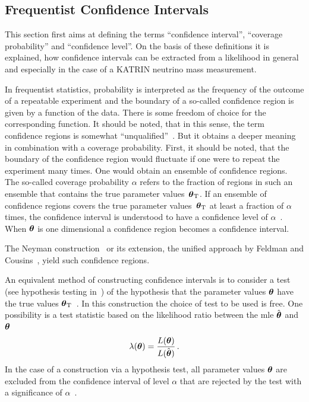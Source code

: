 \subsection{Frequentist Confidence Intervals}
\label{sec:statMethodsUncertaintyIntervalsConfidence}
This section first aims at defining the terms ``confidence interval'', ``coverage probability'' and ``confidence level''. On the basis of these definitions it is explained, how confidence intervals can be extracted from a likelihood in general and especially in the case of a KATRIN neutrino mass measurement.

In frequentist statistics, probability is interpreted as the frequency of the outcome of a repeatable experiment and the boundary of a so-called confidence region is given by a function of the data. There is some freedom of choice for the corresponding function. It should be noted, that in this sense, the term confidence regions is somewhat ``unqualified''~\cite{ReviewOfParticlePhysics}. But it obtains a deeper meaning in combination with a coverage probability. First, it should be noted, that the boundary of the confidence region would fluctuate if one were to repeat the experiment many times. One would obtain an ensemble of confidence regions. The so-called coverage probability $\alpha$ refers to the fraction of regions in such an ensemble that contains the true parameter values~$\boldsymbol{\mathbf{\theta}}_\mathrm{T}$\cite{ReviewOfParticlePhysics}. If an ensemble of confidence regions covers the true parameter values~$\boldsymbol{\mathbf{\theta}}_\mathrm{T}$ at least a fraction of $\alpha$ times, the confidence interval is understood to have a confidence level of $\alpha$~\cite{ReviewOfParticlePhysics}. When $\boldsymbol{\mathbf{\theta}}$ is one dimensional a confidence region becomes a confidence interval. 

The Neyman construction~\cite{Neyman1937} or its extension, the unified approach by Feldman and Cousins~\cite{Feldman1998}, yield such confidence regions.

An equivalent method of constructing confidence intervals is to consider a test (see hypothesis testing in~\cite{ReviewOfParticlePhysics}) of the hypothesis that the parameter values $\boldsymbol{\mathbf{\theta}}$ have the true values $\boldsymbol{\mathbf{\theta}}_\mathrm{T}$~\cite{ReviewOfParticlePhysics}. In this construction the choice of test to be used is free. One possibility is a test statistic based on the likelihood ratio between the \gls{mle} $\hat{\boldsymbol{\mathbf{\theta}}}$ and $\boldsymbol{\mathbf{\theta}}$~\cite{ReviewOfParticlePhysics}
\begin{equation}
	\label{eq:statMethodsLikelihoodRatio}
	\lambda(\boldsymbol{\mathbf{\theta}}) =
	\frac{L(\boldsymbol{\mathbf{\theta}})}{L(\hat{\boldsymbol{\mathbf{\theta}}})}
	\text{\,.}
\end{equation}
In the case of a construction via a hypothesis test, all parameter values $\boldsymbol{\mathbf{\theta}}$ are excluded from the confidence interval of level $\alpha$ that are rejected by the test with a significance of $\alpha$~\cite{ReviewOfParticlePhysics}.

